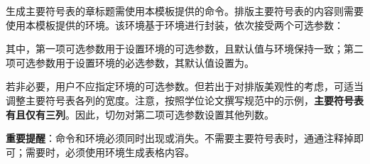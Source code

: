 \documentclass[print, doctor, vlined]{DissertUESTC}
\begin{document}
	

	
	\tableofcontents  %
	
	\listoffigures  %
	
	\listoftables  %
	
	\listofsymbs  %
	
	生成主要符号表的章标题需使用本模板提供的命令。排版主要符号表的内容则需要使用本模板提供的环境。该环境基于环境进行封装，依次接受两个可选参数：
	
	
	\noindent 其中，第一项可选参数用于设置环境的可选参数，且默认值与环境保持一致；第二项可选参数用于设置环境的必选参数，其默认值设置为。
	
	若非必要，用户不应指定环境的可选参数。但若出于对排版美观性的考虑，可适当调整主要符号表各列的宽度。注意，按照学位论文撰写规范中的示例，\textbf{主要符号表有且仅有三列}。因此，切勿对第二项可选参数设置其他列数。
	
	\textbf{重要提醒}：命令和环境必须同时出现或消失。不需要主要符号表时，通通注释掉即可；需要时，必须使用环境生成表格内容。
	
\end{document}
